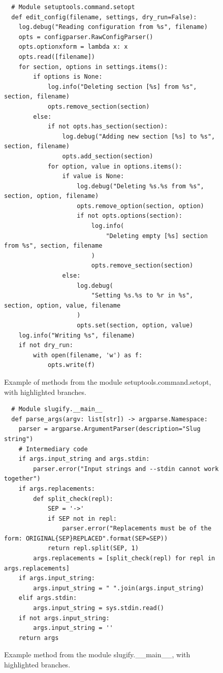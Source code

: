 \documentclass[%
  chapterprefix=false,%
  open=right,%
  twoside=true,%
  paper=a4,%
  logofile={Figures/logo.png},%
  thesistype=master,%
  UKenglish,%
]{se2thesis}
\begin{document}
\begin{figure}
\begin{verbatim}
  # Module setuptools.command.setopt
  def edit_config(filename, settings, dry_run=False):
    log.debug("Reading configuration from %s", filename)
    opts = configparser.RawConfigParser()
    opts.optionxform = lambda x: x
    opts.read([filename])
    for section, options in settings.items():
        if options is None:
            log.info("Deleting section [%s] from %s", section, filename)
            opts.remove_section(section)
        else:
            if not opts.has_section(section):
                log.debug("Adding new section [%s] to %s", section, filename)
                opts.add_section(section)
            for option, value in options.items():
                if value is None:
                    log.debug("Deleting %s.%s from %s", section, option, filename)
                    opts.remove_option(section, option)
                    if not opts.options(section):
                        log.info(
                            "Deleting empty [%s] section from %s", section, filename
                        )
                        opts.remove_section(section)
                else:
                    log.debug(
                        "Setting %s.%s to %r in %s", section, option, value, filename
                    )
                    opts.set(section, option, value)
    log.info("Writing %s", filename)
    if not dry_run:
        with open(filename, 'w') as f:
            opts.write(f)
\end{verbatim}
\caption{Example of methods from the module setuptools.command.setopt, with highlighted branches.}\label{lst:7}
\end{figure}

\begin{figure}
\begin{verbatim}
  # Module slugify.__main__
  def parse_args(argv: list[str]) -> argparse.Namespace:
    parser = argparse.ArgumentParser(description="Slug string")
    # Intermediary code
    if args.input_string and args.stdin:
        parser.error("Input strings and --stdin cannot work together")
    if args.replacements:
        def split_check(repl):
            SEP = '->'
            if SEP not in repl:
                parser.error("Replacements must be of the form: ORIGINAL{SEP}REPLACED".format(SEP=SEP))
            return repl.split(SEP, 1)
        args.replacements = [split_check(repl) for repl in args.replacements]
    if args.input_string:
        args.input_string = " ".join(args.input_string)
    elif args.stdin:
        args.input_string = sys.stdin.read()
    if not args.input_string:
        args.input_string = ''
    return args
\end{verbatim}
\caption{Example method from the module slugify.\_\_main\_\_, with highlighted branches.}\label{lst:8}
\end{figure}
\end{document}
